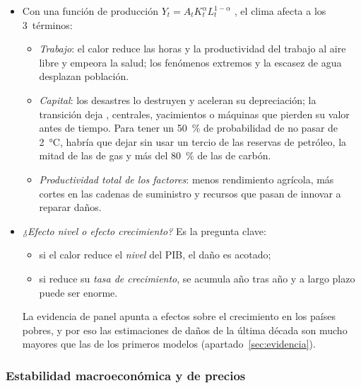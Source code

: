 \documentclass[11pt]{article}
\begin{document}
\begin{itemize}
\item Con una función de producción $Y_t=A_tK_t^{\alpha}L_t^{1-\alpha}$ , el clima afecta a los 3~términos:
  \begin{itemize}
  \item \emph{Trabajo}: el calor reduce las horas y la productividad del trabajo al aire libre y empeora la salud; los fenómenos extremos y la escasez de agua desplazan población.
  \item \emph{Capital}: los desastres lo destruyen y aceleran su depreciación; la transición deja , centrales, yacimientos o máquinas que pierden su valor antes de tiempo. Para tener un 50~\% de probabilidad de no pasar de 2~°C, habría que dejar sin usar un tercio de las reservas de petróleo, la mitad de las de gas y más del 80~\% de las de carbón\nocite{McGladeEkins2015Geographical}.
  \item \emph{Productividad total de los factores}: menos rendimiento agrícola, más cortes en las cadenas de suministro y recursos que pasan de innovar a reparar daños.
  \end{itemize}
\item \emph{¿Efecto nivel o efecto crecimiento?} Es la pregunta clave:
  \begin{itemize}
  \item si el calor reduce el \emph{nivel} del PIB, el daño es acotado;
  \item si reduce su \emph{tasa de crecimiento}, se acumula año tras año y a largo plazo puede ser enorme.
  \end{itemize}
  La evidencia de panel apunta a efectos sobre el crecimiento en los países pobres\nocite{DellJonesOlken2012Temperature}, y por eso las estimaciones de daños de la última década son mucho mayores que las de los primeros modelos (apartado~\ref{sec:evidencia}).
\end{itemize}

\subsubsection{Estabilidad macroeconómica y de precios}\label{sec:canal-precios}
\end{document}
